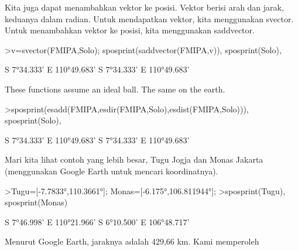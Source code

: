 \documentclass[a4paper,10pt]{article}
\begin{document}
\begin{eulernotebook}
\begin{eulercomment}
\begin{eulercomment}
\begin{eulercomment}
\begin{eulercomment}
\begin{eulercomment}
\begin{eulercomment}
\begin{eulercomment}
\begin{eulercomment}
\begin{eulercomment}
\begin{eulercomment}
\begin{eulercomment}
\begin{eulercomment}
\begin{eulercomment}
\begin{eulercomment}
\begin{eulercomment}
\begin{eulercomment}
\begin{eulercomment}
\begin{eulercomment}
\begin{eulercomment}
\begin{eulercomment}
\begin{eulercomment}
\begin{eulercomment}
\begin{eulercomment}
\begin{eulercomment}
\begin{eulercomment}
\begin{eulercomment}
\begin{eulercomment}
\begin{eulercomment}
\begin{eulercomment}
\begin{eulercomment}
\begin{eulercomment}
\begin{eulercomment}
\begin{eulercomment}
\begin{eulercomment}
\begin{eulercomment}
Kita juga dapat menambahkan vektor ke posisi. Vektor berisi arah dan
jarak, keduanya dalam radian. Untuk mendapatkan vektor, kita
menggunakan svector. Untuk menambahkan vektor ke posisi, kita
menggunakan saddvector.
\end{eulercomment}
\begin{eulerprompt}
>v=svector(FMIPA,Solo); sposprint(saddvector(FMIPA,v)), sposprint(Solo),
\end{eulerprompt}
\begin{euleroutput}
  S 7°34.333' E 110°49.683'
  S 7°34.333' E 110°49.683'
\end{euleroutput}
\begin{eulercomment}
These functions assume an ideal ball. The same on the earth.
\end{eulercomment}
\begin{eulerprompt}
>sposprint(esadd(FMIPA,esdir(FMIPA,Solo),esdist(FMIPA,Solo))), sposprint(Solo),
\end{eulerprompt}
\begin{euleroutput}
  S 7°34.333' E 110°49.683'
  S 7°34.333' E 110°49.683'
\end{euleroutput}
\begin{eulercomment}
Mari kita lihat contoh yang lebih besar, Tugu Jogja dan Monas Jakarta
(menggunakan Google Earth untuk mencari koordinatnya).
\end{eulercomment}
\begin{eulerprompt}
>Tugu=[-7.7833°,110.3661°]; Monas=[-6.175°,106.811944°];
>sposprint(Tugu), sposprint(Monas)
\end{eulerprompt}
\begin{euleroutput}
  S 7°46.998' E 110°21.966'
  S 6°10.500' E 106°48.717'
\end{euleroutput}
\begin{eulercomment}
Menurut Google Earth, jaraknya adalah 429,66 km. Kami memperoleh

\end{eulercomment}
\end{eulercomment}
\end{eulercomment}
\end{eulercomment}
\end{eulercomment}
\end{eulercomment}
\end{eulercomment}
\end{eulercomment}
\end{eulercomment}
\end{eulercomment}
\end{eulercomment}
\end{eulercomment}
\end{eulercomment}
\end{eulercomment}
\end{eulercomment}
\end{eulercomment}
\end{eulercomment}
\end{eulercomment}
\end{eulercomment}
\end{eulercomment}
\end{eulercomment}
\end{eulercomment}
\end{eulercomment}
\end{eulercomment}
\end{eulercomment}
\end{eulercomment}
\end{eulercomment}
\end{eulercomment}
\end{eulercomment}
\end{eulercomment}
\end{eulercomment}
\end{eulercomment}
\end{eulercomment}
\end{eulercomment}
\end{eulercomment}
\end{eulernotebook}
\end{document}
